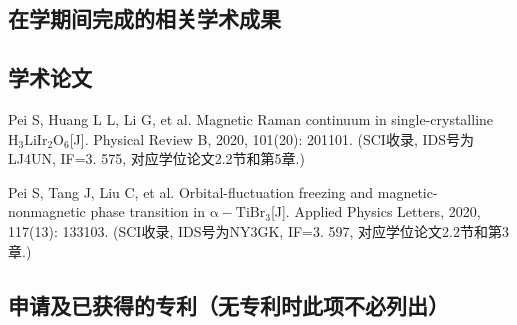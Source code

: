 \begin{resume}


  \section*{在学期间完成的相关学术成果}


  \subsection*{学术论文}

  \begin{achievements}
    \item Pei S, Huang L L, Li G, et al. Magnetic Raman continuum in single-crystalline $\mathrm{H_3LiIr_2O_6}$[J]. Physical Review B, 2020, 101(20): 201101. (SCI收录, IDS号为LJ4UN, IF=3. 575, 对应学位论文2.2节和第5章.)
    \item Pei S, Tang J, Liu C, et al. Orbital-fluctuation freezing and magnetic-nonmagnetic phase transition in $\mathrm{α-TiBr_3}$[J]. Applied Physics Letters, 2020, 117(13): 133103. (SCI收录, IDS号为NY3GK, IF=3. 597, 对应学位论文2.2节和第3章.)
  \end{achievements}

  \subsection*{申请及已获得的专利（无专利时此项不必列出）}


\end{resume}
